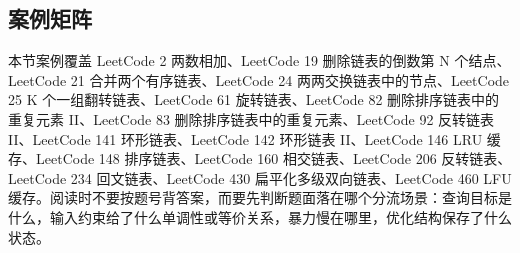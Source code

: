 \subsection{案例矩阵}

本节案例覆盖 LeetCode 2 两数相加、LeetCode 19 删除链表的倒数第 N 个结点、LeetCode 21 合并两个有序链表、LeetCode 24 两两交换链表中的节点、LeetCode 25 K 个一组翻转链表、LeetCode 61 旋转链表、LeetCode 82 删除排序链表中的重复元素 II、LeetCode 83 删除排序链表中的重复元素、LeetCode 92 反转链表 II、LeetCode 141 环形链表、LeetCode 142 环形链表 II、LeetCode 146 LRU 缓存、LeetCode 148 排序链表、LeetCode 160 相交链表、LeetCode 206 反转链表、LeetCode 234 回文链表、LeetCode 430 扁平化多级双向链表、LeetCode 460 LFU 缓存。阅读时不要按题号背答案，而要先判断题面落在哪个分流场景：查询目标是什么，输入约束给了什么单调性或等价关系，暴力慢在哪里，优化结构保存了什么状态。

